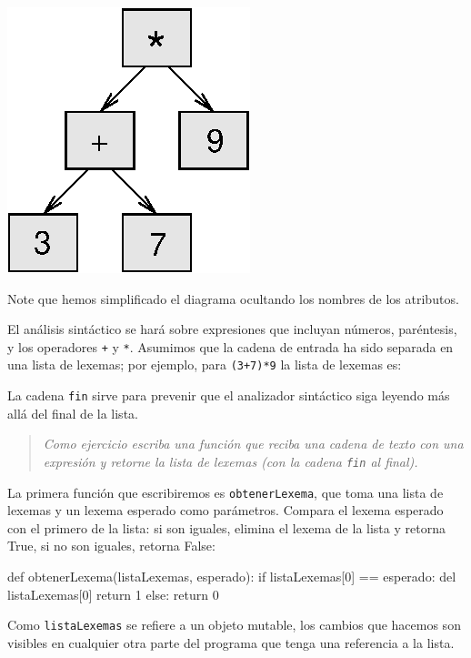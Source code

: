 \beforefig \centerline{\includegraphics{illustrations/tree3}}
\afterfig

Note que hemos simplificado el diagrama ocultando los nombres de los
atributos.

El análisis sintáctico se hará sobre expresiones que incluyan números,
paréntesis, y los operadores \texttt{+} y \texttt{{*}}. Asumimos que
la cadena de entrada ha sido separada en una lista de lexemas; por
ejemplo, para \texttt{(3+7){*}9} la lista de lexemas es:

\beforeverb 
\begin{pythoncode}
['(', 3, '+', 7, ')', '*', 9, 'fin']
\end{pythoncode}
\afterverb La cadena \texttt{fin} sirve para prevenir que el analizador
sintáctico siga leyendo más allá del final de la lista.
\begin{quote}
{\em Como ejercicio escriba una función que reciba una cadena de
texto con una expresión y retorne la lista de lexemas (con la cadena
\texttt{fin} al final).} 
\end{quote}
La primera función que escribiremos es \texttt{obtenerLexema}, que
toma una lista de lexemas y un lexema esperado como parámetros. Compara
el lexema esperado con el primero de la lista: si son iguales, elimina
el lexema de la lista y retorna True, si no son iguales, retorna False:

\beforeverb 
\begin{pythoncode}
def obtenerLexema(listaLexemas, esperado):
  if listaLexemas[0] == esperado:
    del listaLexemas[0]
    return 1
  else:
    return 0
\end{pythoncode}
\afterverb Como \texttt{listaLexemas} se refiere a un objeto mutable,
los cambios que hacemos son visibles en cualquier otra parte del programa
que tenga una referencia a la lista.

